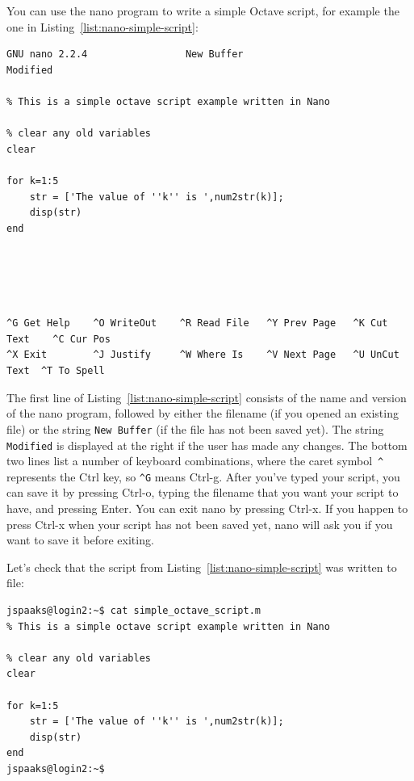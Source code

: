 You can use the nano program to write a simple Octave script, for example the one in Listing~\ref{list:nano-simple-script}:
\begin{lstlisting}[style=numbered,style=basic,style=bash,style=numbered,caption={Example of a simple Octave script in nano.},label=list:nano-simple-script]
  GNU nano 2.2.4                 New Buffer                                   Modified

% This is a simple octave script example written in Nano

% clear any old variables
clear

for k=1:5
    str = ['The value of ''k'' is ',num2str(k)];
    disp(str)
end





^G Get Help    ^O WriteOut    ^R Read File   ^Y Prev Page   ^K Cut Text    ^C Cur Pos
^X Exit        ^J Justify     ^W Where Is    ^V Next Page   ^U UnCut Text  ^T To Spell
\end{lstlisting}
The first line of Listing~\ref{list:nano-simple-script} consists of the name and version of the nano program, followed by either the filename (if you opened an existing file) or the string \lstinline[style=bashinline]{New Buffer} (if the file has not been saved yet). The string \lstinline[style=bashinline]{Modified} is displayed at the right if the user has made any changes. The bottom two lines list a number of keyboard combinations, where the caret symbol~\lstinline[style=bashinline]{^} represents the Ctrl key, so \lstinline[style=bashinline]{^G} means Ctrl-g. After you've typed your script, you can save it by pressing Ctrl-o, typing the filename that you want your script to have, and pressing Enter. You can exit nano by pressing Ctrl-x. If you happen to press Ctrl-x when your script has not been saved yet, nano will ask you if you want to save it before exiting.

Let's check that the script from Listing~\ref{list:nano-simple-script} was written to file:
\begin{lstlisting}[style=basic,style=bash]
jspaaks@login2:~$ cat simple_octave_script.m
% This is a simple octave script example written in Nano

% clear any old variables
clear

for k=1:5
    str = ['The value of ''k'' is ',num2str(k)];
    disp(str)
end
jspaaks@login2:~$
\end{lstlisting}


